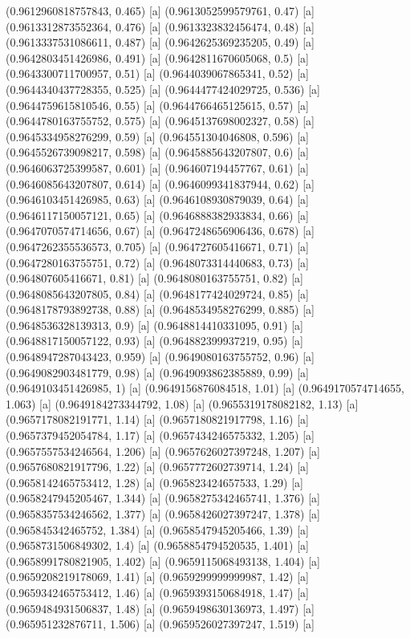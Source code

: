 {{{(0.9612960818757843, 0.465) [a] 
(0.9613052599579761, 0.47) [a] 
(0.9613312873552364, 0.476) [a] 
(0.9613323832456474, 0.48) [a] 
(0.9613337531086611, 0.487) [a] 
(0.9642625369235205, 0.49) [a] 
(0.9642803451426986, 0.491) [a] 
(0.9642811670605068, 0.5) [a] 
(0.9643300711700957, 0.51) [a] 
(0.9644039067865341, 0.52) [a] 
(0.9644340437728355, 0.525) [a] 
(0.9644477424029725, 0.536) [a] 
(0.9644759615810546, 0.55) [a] 
(0.9644766465125615, 0.57) [a] 
(0.9644780163755752, 0.575) [a] 
(0.9645137698002327, 0.58) [a] 
(0.9645334958276299, 0.59) [a] 
(0.964551304046808, 0.596) [a] 
(0.9645526739098217, 0.598) [a] 
(0.9645885643207807, 0.6) [a] 
(0.9646063725399587, 0.601) [a] 
(0.964607194457767, 0.61) [a] 
(0.9646085643207807, 0.614) [a] 
(0.9646099341837944, 0.62) [a] 
(0.9646103451426985, 0.63) [a] 
(0.9646108930879039, 0.64) [a] 
(0.9646117150057121, 0.65) [a] 
(0.9646888382933834, 0.66) [a] 
(0.9647070574714656, 0.67) [a] 
(0.9647248656906436, 0.678) [a] 
(0.9647262355536573, 0.705) [a] 
(0.964727605416671, 0.71) [a] 
(0.9647280163755751, 0.72) [a] 
(0.9648073314440683, 0.73) [a] 
(0.964807605416671, 0.81) [a] 
(0.9648080163755751, 0.82) [a] 
(0.9648085643207805, 0.84) [a] 
(0.9648177424029724, 0.85) [a] 
(0.9648178793892738, 0.88) [a] 
(0.9648534958276299, 0.885) [a] 
(0.9648536328139313, 0.9) [a] 
(0.9648814410331095, 0.91) [a] 
(0.9648817150057122, 0.93) [a] 
(0.964882399937219, 0.95) [a] 
(0.9648947287043423, 0.959) [a] 
(0.9649080163755752, 0.96) [a] 
(0.9649082903481779, 0.98) [a] 
(0.9649093862385889, 0.99) [a] 
(0.9649103451426985, 1) [a] 
(0.9649156876084518, 1.01) [a] 
(0.9649170574714655, 1.063) [a] 
(0.9649184273344792, 1.08) [a] 
(0.9655319178082182, 1.13) [a] 
(0.9657178082191771, 1.14) [a] 
(0.9657180821917798, 1.16) [a] 
(0.9657379452054784, 1.17) [a] 
(0.9657434246575332, 1.205) [a] 
(0.9657557534246564, 1.206) [a] 
(0.9657626027397248, 1.207) [a] 
(0.9657680821917796, 1.22) [a] 
(0.9657772602739714, 1.24) [a] 
(0.9658142465753412, 1.28) [a] 
(0.965823424657533, 1.29) [a] 
(0.9658247945205467, 1.344) [a] 
(0.9658275342465741, 1.376) [a] 
(0.9658357534246562, 1.377) [a] 
(0.9658426027397247, 1.378) [a] 
(0.965845342465752, 1.384) [a] 
(0.9658547945205466, 1.39) [a] 
(0.9658731506849302, 1.4) [a] 
(0.9658854794520535, 1.401) [a] 
(0.9658991780821905, 1.402) [a] 
(0.9659115068493138, 1.404) [a] 
(0.9659208219178069, 1.41) [a] 
(0.9659299999999987, 1.42) [a] 
(0.9659342465753412, 1.46) [a] 
(0.9659393150684918, 1.47) [a] 
(0.9659484931506837, 1.48) [a] 
(0.9659498630136973, 1.497) [a] 
(0.965951232876711, 1.506) [a] 
(0.9659526027397247, 1.519) [a] 
}}}
